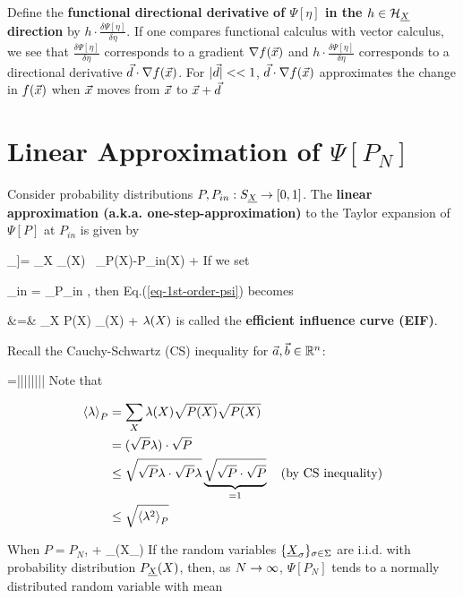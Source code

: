 Define the
{\bf functional directional derivative of $\Psi[\eta]$ in
the $h\in {\cal H}_{\underline{X}}$
direction}
by $h\cdot\frac{\delta \Psi[\eta]}{\delta \eta}$.
If one compares functional calculus with vector calculus, we see that
$\frac{\delta \Psi[\eta]}{\delta \eta}$ corresponds to a gradient
$\nabla f({\vec{x}})$ and
$h\cdot \frac{\delta \Psi[\eta]}{\delta \eta}$
corresponds to a directional derivative
${\vec{d}}\cdot \nabla f({\vec{x}})$.
For $|{\vec{d}}|<<1$, ${\vec{d}}\cdot \nabla f({\vec{x}})$ approximates
the change
in $f({\vec{x}})$ when ${\vec{x}}$ moves from ${\vec{x}}$ to ${\vec{x}}+{\vec{d}}$


\section{Linear Approximation of $\Psi[P_N]$}



Consider probability
distributions $P, P_{in}:S_{\underline{X}}\rightarrow [0,1]$.
The {\bf linear approximation (a.k.a.
one-step-approximation)}
to the Taylor expansion of $\Psi[P]$ at
$P_{in}$ is given by

\beq
\underbrace{\Psi[P] - \Psi[P_{in}]}_{\delta \Psi[P,P_{in}]}]=
\sum_X
_{\dpsi[P_{in}](X)}
\
_{P(X)-P_{in}(X)}
+
\calr[P, P_{in}]
\label{eq-1st-order-psi}
\eeq
If we set

\beq
\dpsi_{in} = \av{\dpsi[P_{in}]}_{P_{in}}
\;,
\eeq
then Eq.(\ref{eq-1st-order-psi}) becomes

\beqa
\delta\Psi[P,P_{in}]&=&
\sum_X P(X)
_{\lam(X)}
+
\calr[P, P_{in}]
\eeqa
$\lambda(X)$  is called the {\bf efficient influence curve (EIF)}.

Recall the Cauchy-Schwartz (CS) inequality for $\vec{a}, \vec{b}\in{ \mathbb{R}}^n$:

\beq
{}\cdot{} =||||\cos\theta\leq ||||
\eeq
Note that

\begin{align}
\left\langle\lambda\right\rangle_P
&=
 \sum_X\lambda(X)\sqrt{P(X)}\sqrt{P(X)}
\\
&=
(\sqrt{P}\lambda)\cdot\sqrt{P}
\\
&\leq
\sqrt{\sqrt{P}\lambda\cdot
\sqrt{P}\lambda}
\underbrace{\sqrt{\sqrt{P}\cdot\sqrt{P}}}_{=1}
\quad \text{(by CS inequality)}
\\
&\leq
\sqrt{ \left\langle\lambda^2\right\rangle_P
}
\end{align}

When $P=P_N$,
\beq
\Psi[P_N]\approx \Psi[P_{in}] + \sum_\s \lam(X_\s)
\eeq
If the random variables $\{{\underline{X}}_\sigma\}_{\sigma\in\Sigma}$ are i.i.d.
with probability distribution $P_{\underline{X}}(X)$,
then, as $N\rightarrow \infty$, $\Psi[P_N]$ tends to a normally
distributed random variable with mean

